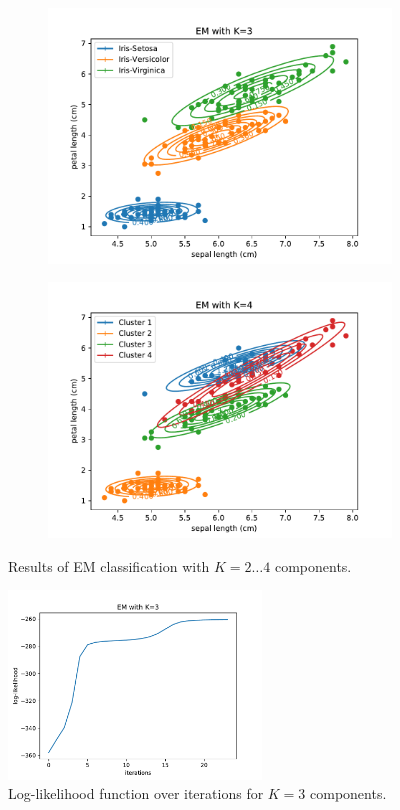 \documentclass{article}
\begin{document}
\begin{figure}[!ht]
{\begin{subfigure}{0.6\textwidth}
	\includegraphics[width=\textwidth]{./Figures/2_1_EM_cont_K3}
	\end{subfigure}
	\begin{subfigure}{0.6\textwidth}
	\includegraphics[width=\textwidth]{./Figures/2_1_EM_cont_K4}
	\end{subfigure}
	}	
	\caption{Results of EM classification with $K=2\dots4$ components.}
	\label{2_1_EM_cont}
\end{figure}

\begin{figure}[!ht]
\centering
\includegraphics[width=0.6\textwidth]{./Figures/2_1_EM_likelihood_K3}
\caption{Log-likelihood function over iterations for $K=3$ components.}
\label{2_1_EM_likelihood}
\end{figure}
\end{document}
